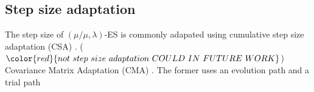  
\subsection{Step size adaptation}

The step size of $(\mu/\mu,\lambda)$-ES is commonly adapated using cumulative step size adaptation (CSA) \cite{Ostermeier:1994:DAS:1326675.1326679}. ($\color{red}{not\ step\ size\ adaptation\ COULD\ IN\ FUTURE\ WORK}$) Covariance Matrix Adaptation (CMA) \cite{Hansen:2003:RTC:772374.772376}. The former uses an evolution path and a trial path 







